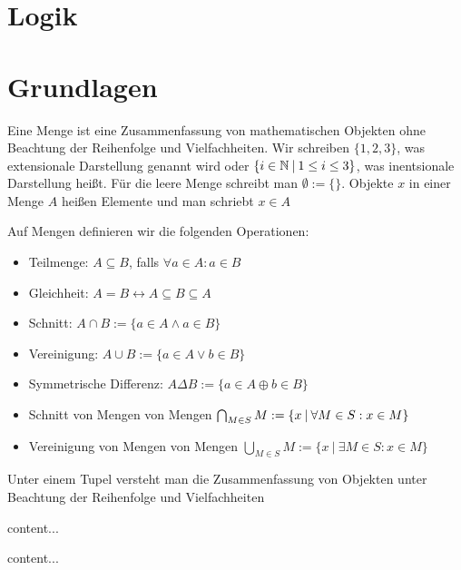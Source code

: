 \section{Logik}

\section{Grundlagen}

\begin{definition}[Menge]
	Eine Menge ist eine Zusammenfassung von mathematischen Objekten ohne Beachtung der Reihenfolge und Vielfachheiten. Wir schreiben $\{1, 2, 3\}$, was extensionale Darstellung genannt wird oder $\{i \in \mathbb{N} \medspace | \medspace 1 \leq i \leq 3  \}$, was inentsionale Darstellung heißt. Für die leere Menge schreibt man $\emptyset := \{\}$. Objekte $x$ in einer Menge $A$ heißen Elemente und man schriebt $x \in A$
	
	Auf Mengen definieren wir die folgenden Operationen:
	\begin{itemize}[noitemsep]
		\item Teilmenge: $A \subseteq B$, falls $\forall a \in A : a \in B$
		\item Gleichheit: $A = B \leftrightarrow A \subseteq B \subseteq A$
		\item Schnitt: $A \cap B := \{ a \in A \land a \in B\}$
		\item Vereinigung: $A \cup B := \{ a \in A \lor b \in B\}$
		\item Symmetrische Differenz: $A \Delta B := \{a \in A \oplus b \in B\}$
		\item Schnitt von Mengen von Mengen $\bigcap_{M \in S} M := \{x \medspace | \medspace \forall M \in S: x \in M\}$
		\item Vereinigung von Mengen von Mengen $\bigcup_{M \in S} M := \{x \medspace | \medspace \exists M \in S: x \in M\}$
	\end{itemize}
\end{definition}

\begin{definition}
	Unter einem Tupel versteht man die Zusammenfassung von Objekten unter Beachtung der Reihenfolge und Vielfachheiten
\end{definition}

\begin{definition}[Relationen]
	content...
\end{definition}

\begin{definition}[Funktionen]
	content...
\end{definition}

